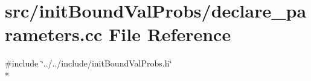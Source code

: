 \section{src/init\-Bound\-Val\-Probs/declare\-\_\-parameters.cc File Reference}
\label{init_bound_val_probs_2declare__parameters_8cc}
{\ttfamily \#include \char`\"{}../../include/init\-Bound\-Val\-Probs.\-h\char`\"{}}\\*
